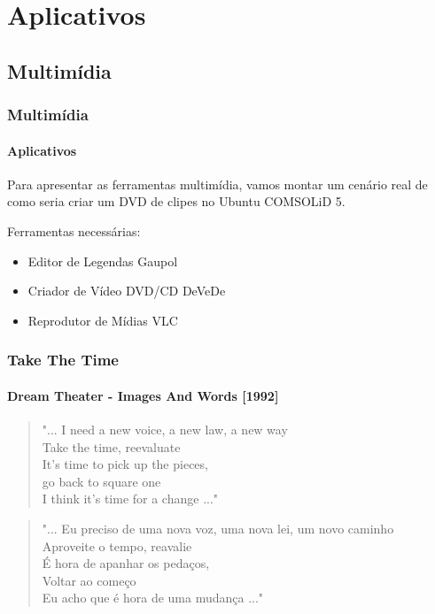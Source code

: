 \section{Aplicativos}

\begin{frame}


\end{frame}

\subsection{Multimídia}

\begin{frame}


\end{frame}

\begin{frame}\frametitle{Multimídia}\framesubtitle{Aplicativos}

Para apresentar as ferramentas multimídia, vamos montar um cenário real de como
seria criar um DVD de clipes no Ubuntu COMSOLiD 5.

Ferramentas necessárias:
\begin{itemize}
	\item Editor de Legendas Gaupol
	\item Criador de Vídeo DVD/CD DeVeDe
	\item Reprodutor de Mídias VLC
\end{itemize}

\end{frame}

\begin{frame}\frametitle{Take The Time}\framesubtitle{Dream Theater - Images And Words [1992]}

\begin{quote}
"... I need a new {\Large voice}, a new {\Large law}, a {\LARGE new way}\\
Take the time, reevaluate\\
It's time to {\LARGE pick up the pieces},\\
go back to {\large square one}\\
I think it's {\huge time for a change} ..."
\end{quote}

\begin{quote}
"... Eu preciso de uma nova voz, uma nova lei, um novo caminho\\
Aproveite o tempo, reavalie\\
É hora de apanhar os pedaços,\\
Voltar ao começo\\
Eu acho que é hora de uma mudança ..."
\end{quote}

\end{frame}

